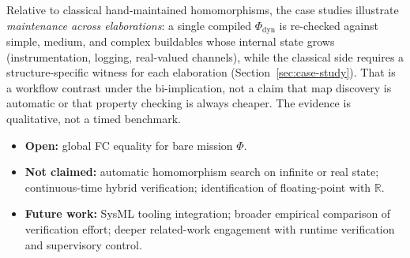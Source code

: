 Relative to classical hand-maintained homomorphisms, the case studies illustrate \emph{maintenance across elaborations}: a single compiled $\Phi_{\mathrm{dyn}}$ is re-checked against simple, medium, and complex buildables whose internal state grows (instrumentation, logging, real-valued channels), while the classical side requires a structure-specific witness for each elaboration (Section~\ref{sec:case-study}). That is a workflow contrast under the bi-implication, not a claim that map discovery is automatic or that property checking is always cheaper. The evidence is qualitative, not a timed benchmark.

\begin{itemize}
    \item \textbf{Open:} global FC equality for bare mission $\Phi$.
    \item \textbf{Not claimed:} automatic homomorphism search on infinite or real state; continuous-time hybrid verification; identification of floating-point with $\mathbb{R}$.
    \item \textbf{Future work:} SysML tooling integration; broader empirical comparison of verification effort; deeper related-work engagement with runtime verification and supervisory control.
\end{itemize}
